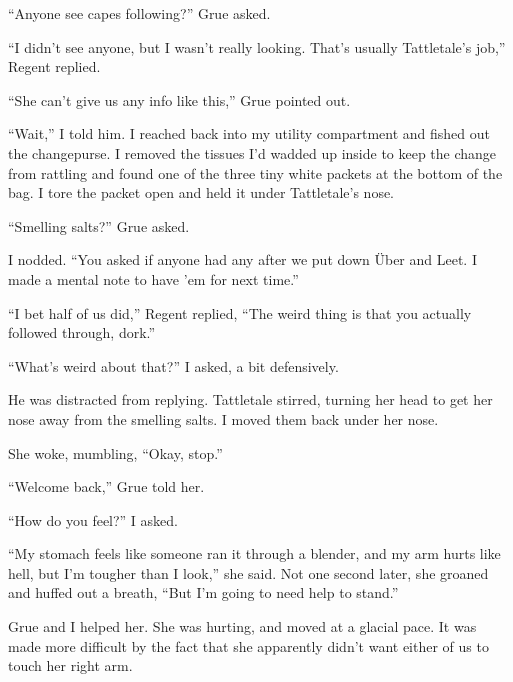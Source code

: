 ``Anyone see capes following?'' Grue asked.



``I didn't see anyone, but I wasn't really looking.  That's usually Tattletale's job,'' Regent replied.



``She can't give us any info like this,'' Grue pointed out.



``Wait,'' I told him.  I reached back into my utility compartment and fished out the changepurse.  I removed the tissues I'd wadded up inside to keep the change from rattling and found one of the three tiny white packets at the bottom of the bag.  I tore the packet open and held it under Tattletale's nose.



``Smelling salts?'' Grue asked.



I nodded.  ``You asked if anyone had any after we put down \"{U}ber and Leet.  I made a mental note to have 'em for next time.''



``I bet half of us did,'' Regent replied, ``The weird thing is that you actually followed through, dork.''



``What's weird about that?'' I asked, a bit defensively.



He was distracted from replying.  Tattletale stirred, turning her head to get her nose away from the smelling salts.  I moved them back under her nose.



She woke, mumbling, ``Okay, stop.''



``Welcome back,'' Grue told her.



``How do you feel?'' I asked.



``My stomach feels like someone ran it through a blender, and my arm hurts like hell, but I'm tougher than I look,'' she said.  Not one second later, she groaned and huffed out a breath, ``But I'm going to need help to stand.''



Grue and I helped her.  She was hurting, and moved at a glacial pace.  It was made more difficult by the fact that she apparently didn't want either of us to touch her right arm.



